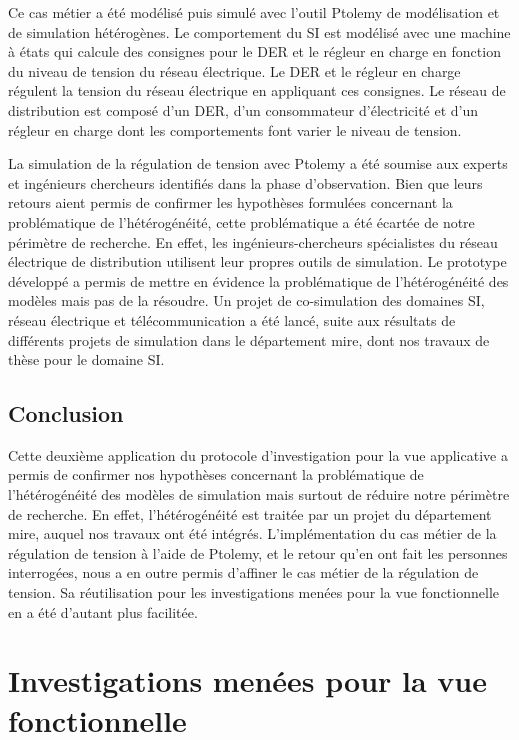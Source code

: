		Ce cas métier a été modélisé puis simulé avec l'outil Ptolemy de modélisation et de simulation hétérogènes. Le comportement du SI est modélisé avec une machine à états qui calcule des consignes pour le DER et le régleur en charge en fonction du niveau de tension du réseau électrique. Le DER et le régleur en charge régulent la tension du réseau électrique en appliquant ces consignes. Le réseau de distribution est composé d'un DER, d'un consommateur d'électricité et d'un régleur en charge dont les comportements font varier le niveau de tension.
		
		La simulation de la régulation de tension avec Ptolemy a été soumise aux experts et ingénieurs chercheurs identifiés dans la phase d'observation. Bien que leurs retours aient permis de confirmer les hypothèses formulées concernant la problématique de l'hétérogénéité, cette problématique a été écartée de notre périmètre de recherche. En effet, les ingénieurs-chercheurs spécialistes du réseau électrique de distribution utilisent leur propres outils de simulation. Le prototype développé a permis de mettre en évidence la problématique de l'hétérogénéité des modèles mais pas de la résoudre. Un projet de co-simulation des domaines SI, réseau électrique et télécommunication a été lancé, suite aux résultats de différents projets de simulation dans le département \gls{mire}, dont nos travaux de thèse pour le domaine SI.


\subsection{Conclusion}
Cette deuxième application du protocole d'investigation pour la vue applicative a permis de confirmer nos hypothèses concernant la problématique de l'hétérogénéité des modèles de simulation mais surtout de réduire notre périmètre de recherche. En effet, l'hétérogénéité est traitée par un projet du département \gls{mire}, auquel nos travaux ont été intégrés. L'implémentation du cas métier de la régulation de tension à l'aide de Ptolemy, et le retour qu'en ont fait les personnes interrogées, nous a en outre permis d'affiner le cas métier de la régulation de tension. Sa réutilisation pour les investigations menées pour la vue fonctionnelle en a été d'autant plus facilitée.   

\section{Investigations menées pour la vue fonctionnelle} 
\label{sec:exploration_fonctionnelle}


